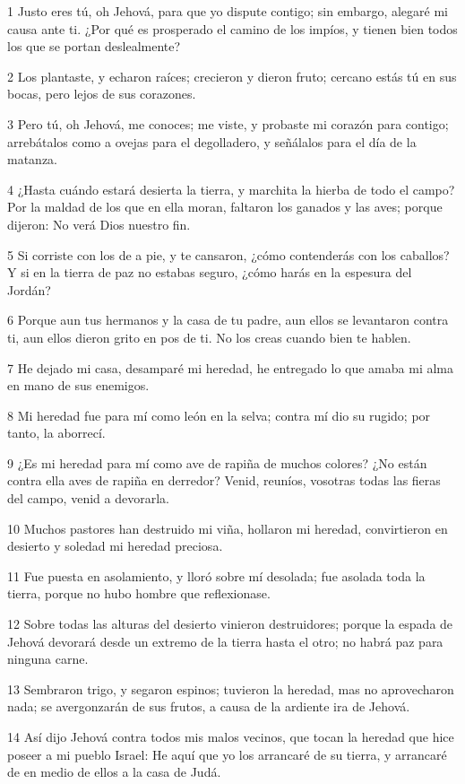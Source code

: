 \par 1 Justo eres tú, oh Jehová, para que yo dispute contigo; sin embargo, alegaré mi causa ante ti. ¿Por qué es prosperado el camino de los impíos, y tienen bien todos los que se portan deslealmente?
\par 2 Los plantaste, y echaron raíces; crecieron y dieron fruto; cercano estás tú en sus bocas, pero lejos de sus corazones.
\par 3 Pero tú, oh Jehová, me conoces; me viste, y probaste mi corazón para contigo; arrebátalos como a ovejas para el degolladero, y señálalos para el día de la matanza.
\par 4 ¿Hasta cuándo estará desierta la tierra, y marchita la hierba de todo el campo? Por la maldad de los que en ella moran, faltaron los ganados y las aves; porque dijeron: No verá Dios nuestro fin.
\par 5 Si corriste con los de a pie, y te cansaron, ¿cómo contenderás con los caballos? Y si en la tierra de paz no estabas seguro, ¿cómo harás en la espesura del Jordán?
\par 6 Porque aun tus hermanos y la casa de tu padre, aun ellos se levantaron contra ti, aun ellos dieron grito en pos de ti. No los creas cuando bien te hablen.
\par 7 He dejado mi casa, desamparé mi heredad, he entregado lo que amaba mi alma en mano de sus enemigos.
\par 8 Mi heredad fue para mí como león en la selva; contra mí dio su rugido; por tanto, la aborrecí.
\par 9 ¿Es mi heredad para mí como ave de rapiña de muchos colores? ¿No están contra ella aves de rapiña en derredor? Venid, reuníos, vosotras todas las fieras del campo, venid a devorarla.
\par 10 Muchos pastores han destruido mi viña, hollaron mi heredad, convirtieron en desierto y soledad mi heredad preciosa.
\par 11 Fue puesta en asolamiento, y lloró sobre mí desolada; fue asolada toda la tierra, porque no hubo hombre que reflexionase.
\par 12 Sobre todas las alturas del desierto vinieron destruidores; porque la espada de Jehová devorará desde un extremo de la tierra hasta el otro; no habrá paz para ninguna carne.
\par 13 Sembraron trigo, y segaron espinos; tuvieron la heredad, mas no aprovecharon nada; se avergonzarán de sus frutos, a causa de la ardiente ira de Jehová.
\par 14 Así dijo Jehová contra todos mis malos vecinos, que tocan la heredad que hice poseer a mi pueblo Israel: He aquí que yo los arrancaré de su tierra, y arrancaré de en medio de ellos a la casa de Judá.
